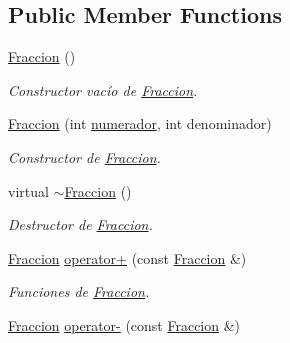 \subsection*{Public Member Functions}
\begin{DoxyCompactItemize}
\item 
\hypertarget{class_fraccion_a80b8bb475192ceb820428a57e911ceb5}{\hyperlink{class_fraccion_a80b8bb475192ceb820428a57e911ceb5}{Fraccion} ()}\label{class_fraccion_a80b8bb475192ceb820428a57e911ceb5}

\begin{DoxyCompactList}\small\item\em Constructor vacío de \hyperlink{class_fraccion}{Fraccion}. \end{DoxyCompactList}\item 
\hypertarget{class_fraccion_a6f9e2752a686e2508b94f33cbdc9ab15}{\hyperlink{class_fraccion_a6f9e2752a686e2508b94f33cbdc9ab15}{Fraccion} (int \hyperlink{class_fraccion_a88946835a0fe344bf223ac98e23f4e4a}{numerador}, int denominador)}\label{class_fraccion_a6f9e2752a686e2508b94f33cbdc9ab15}

\begin{DoxyCompactList}\small\item\em Constructor de \hyperlink{class_fraccion}{Fraccion}. \end{DoxyCompactList}\item 
\hypertarget{class_fraccion_abb2ec579092e5bc50e7c3644ea718084}{virtual \hyperlink{class_fraccion_abb2ec579092e5bc50e7c3644ea718084}{$\sim$\+Fraccion} ()}\label{class_fraccion_abb2ec579092e5bc50e7c3644ea718084}

\begin{DoxyCompactList}\small\item\em Destructor de \hyperlink{class_fraccion}{Fraccion}. \end{DoxyCompactList}\item 
\hyperlink{class_fraccion}{Fraccion} \hyperlink{class_fraccion_a5aa3438285f57e1ccce0aa2f1602bd26}{operator+} (const \hyperlink{class_fraccion}{Fraccion} \&)
\begin{DoxyCompactList}\small\item\em Funciones de \hyperlink{class_fraccion}{Fraccion}. \end{DoxyCompactList}\item 
\hypertarget{class_fraccion_a3844e2c49a0439d19495064cf138e857}{\hyperlink{class_fraccion}{Fraccion} \hyperlink{class_fraccion_a3844e2c49a0439d19495064cf138e857}{operator-\/} (const \hyperlink{class_fraccion}{Fraccion} \&)}\label{class_fraccion_a3844e2c49a0439d19495064cf138e857}


\end{DoxyCompactItemize}
